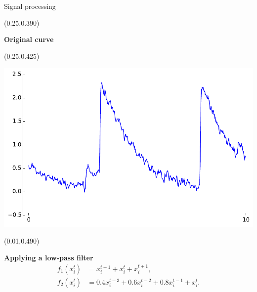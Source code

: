 \documentclass[final]{beamer}
\newenvironment{shaded2}{%
  \def\FrameCommand{\fboxsep=\FrameSep \colorbox{blue!20}}%
  \MakeFramed {\FrameRestore}}%
 {\endMakeFramed}
\begin{document}
\begin{frame}{}
\begin{textblock}{0.485}
\begin{block}{Signal processing \phantom{p}}
\begin{textblock}{0.485}(0.25,0.390)
\begin{minipage}{0.48\linewidth}
\begin{shaded}
\vspace{15pt}
\hspace{1cm} {\small \textbf{Original curve}}
\vspace{30pt}
\end{shaded}
\end{minipage}
\end{textblock}

\begin{textblock}{0.485}(0.25,0.425)
\begin{minipage}{0.48\linewidth}
\begin{shaded2}
\begin{center}

\includegraphics[width=0.85\linewidth]{images/filter_curve_2.pdf}
\end{center}
\vspace{15pt}
\end{shaded2}
\end{minipage}
\end{textblock}

\begin{textblock}{0.485}(0.01,0.490)
\begin{minipage}{0.48\linewidth}
\begin{shaded2}
\vspace{1pt}
{\color{lightgreen} \textbf{Applying a low-pass filter}}
\vspace{-5pt}
\begin{align*}
f_1(x^t_i) &= x^{t-1}_i + x^t_i + x^{t+1}_i,\\
f_2(x^t_i) &= 0.4 x^{t-3}_i + 0.6 x^{t-2}_i + 0.8 x^{t-1}_i + x_i^t.
\end{align*}
\vspace{-10pt}
\end{shaded2}
\end{minipage}
\end{textblock}


\end{block}
\end{textblock}
\end{frame}
\end{document}
